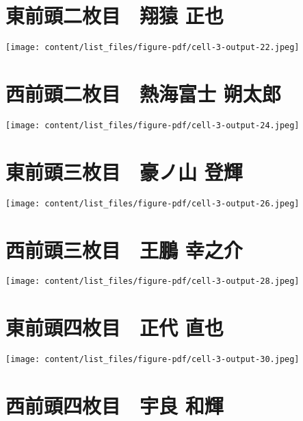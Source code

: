 \documentclass[
  letterpaper,
]{bxjsbook}
\begin{document}
\section{東前頭二枚目　翔猿
正也}\label{ux6771ux524dux982dux4e8cux679aux76ee-ux7fd4ux733f-ux6b63ux4e5f}

\texttt{[image: content/list\_files/figure-pdf/cell-3-output-22.jpeg]}

\section{西前頭二枚目　熱海富士
朔太郎}\label{ux897fux524dux982dux4e8cux679aux76ee-ux71b1ux6d77ux5bccux58eb-ux6714ux592aux90ce}

\texttt{[image: content/list\_files/figure-pdf/cell-3-output-24.jpeg]}

\section{東前頭三枚目　豪ノ山
登輝}\label{ux6771ux524dux982dux4e09ux679aux76ee-ux8c6aux30ceux5c71-ux767bux8f1d}

\texttt{[image: content/list\_files/figure-pdf/cell-3-output-26.jpeg]}

\section{西前頭三枚目　王鵬
幸之介}\label{ux897fux524dux982dux4e09ux679aux76ee-ux738bux9d6c-ux5e78ux4e4bux4ecb}

\texttt{[image: content/list\_files/figure-pdf/cell-3-output-28.jpeg]}

\section{東前頭四枚目　正代
直也}\label{ux6771ux524dux982dux56dbux679aux76ee-ux6b63ux4ee3-ux76f4ux4e5f}

\texttt{[image: content/list\_files/figure-pdf/cell-3-output-30.jpeg]}

\section{西前頭四枚目　宇良
和輝}\label{ux897fux524dux982dux56dbux679aux76ee-ux5b87ux826f-ux548cux8f1d}
\end{document}
